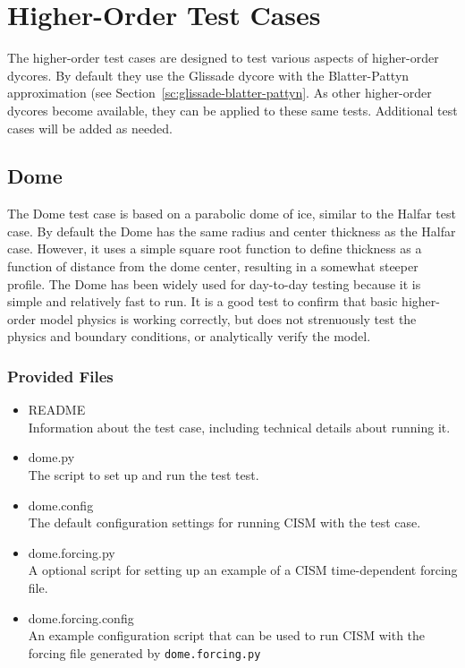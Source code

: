 
\section{Higher-Order Test Cases}
\label{sc:ho-tests}

The higher-order test cases are designed to test various aspects of higher-order dycores.
By default they use the Glissade dycore with the Blatter-Pattyn approximation 
(see Section~\ref{sc:glissade-blatter-pattyn}.
As other higher-order dycores become available, they can be applied
to these same tests. Additional test cases will be added as needed.

\subsection{Dome}
The Dome test case is based on a parabolic dome of ice, similar to the Halfar test case.
By default the Dome has the same radius and center thickness as the Halfar case.
However, it uses a simple square root function to define thickness as a function 
of distance from the dome center, resulting in a somewhat steeper profile.  
The Dome has been widely used for day-to-day testing
because it is simple and relatively fast to run.  It is a good test
to confirm that basic higher-order model physics is working correctly, but does
not strenuously test the physics and boundary conditions, or analytically verify the model.

\subsubsection{Provided Files}

\begin{itemize}
	\item README \\
		Information about the test case, including technical details about running it.
	\item dome.py \\
		The script to set up and run the test test.
 	 \item dome.config \\
  		The default configuration settings for running CISM with the test case.
	\item dome.forcing.py \\
		A optional script for setting up an example of a CISM time-dependent forcing file.
  	\item dome.forcing.config \\
  		An example configuration script that can be used to run CISM with the forcing file
  		generated by \texttt{dome.forcing.py}
\end{itemize}

